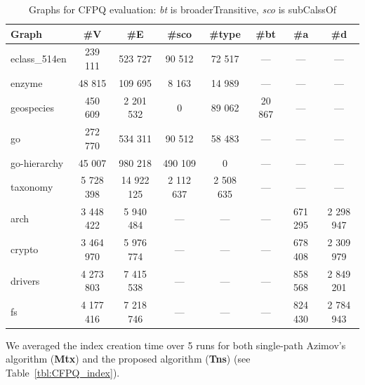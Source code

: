 {\setlength{\tabcolsep}{0.2em}
\begin{table}[h]
    \centering
{
\caption{Graphs for CFPQ evaluation: \textit{bt} is broaderTransitive, \textit{sco} is subCalssOf}
\label{tbl:graphs_for_cfpq}
\scriptsize
\begin{tabular}{|l|c|c|c|c|c|c|c|}
\hline
Graph          & \#V       & \#E        & \#sco & \#type &\#bt & \#a  & \#d \\
\hline
\hline
eclass\_514en  & 239 111    & 523 727    & 90 512    & 72 517    &        ---        & ---  & --- \\
enzyme         & 48 815     & 109 695    & 8 163     & 14 989    &        ---        & ---  & --- \\
geospecies     & 450 609    & 2 201 532  & 0         & 89 062    &        20 867     & ---  & --- \\
go             & 272 770    & 534 311    & 90 512    & 58 483    &        ---        & ---  & --- \\
go-hierarchy   & 45 007     & 980 218    & 490 109   & 0         &        ---        & ---  & --- \\
taxonomy       & 5 728 398  & 14 922 125 & 2 112 637 & 2 508 635 &        ---        & ---  & --- \\
\hline
arch           & 3 448 422  & 5 940 484  &      ---     &  ---   &        ---        & 671 295 & 2 298 947 \\
crypto         & 3 464 970  & 5 976 774  &      ---     &  ---   &        ---        & 678 408 & 2 309 979 \\
drivers        & 4 273 803  & 7 415 538  &      ---     &  ---   &        ---        & 858 568 & 2 849 201 \\
fs             & 4 177 416  & 7 218 746  &      ---     &  ---   &        ---        & 824 430 & 2 784 943 \\
\hline
\end{tabular}
}
\end{table}
}

We averaged the index creation time over 5 runs for both single-path Azimov's algorithm (\textbf{Mtx}) and the proposed algorithm (\textbf{Tns}) (see Table~\ref{tbl:CFPQ_index}).

